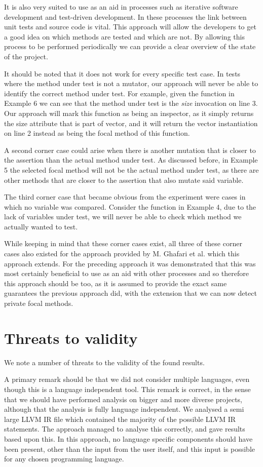 \documentclass[11pt]{article}
\begin{document}
\begin{multicols}{2}
It is also very suited to use as an aid in processes such as  iterative software development and test-driven development. In these processes the link between unit tests and source code is vital. This approach will allow the developers to get a good idea on which methods are tested and which are not. By allowing this process to be performed periodically we can provide a clear overview of the state of the project.

It should be noted that it does not work for every specific test case. In tests where the method under test is not a mutator, our approach will never be able to identify the correct method under test. For example, given the function in Example 6 we can see that the method under test is the \textit{size} invocation on line 3. Our approach will mark this function as being an inspector, as it simply returns the size attribute that is part of vector, and it will return the vector instantiation on line 2 instead as being the focal method of this function. 

A second corner case could arise when there is another mutation that is closer to the assertion than the actual method under test. As discussed before, in Example 5 the selected focal method will not be the actual method under test, as there are other methods that are closer to the assertion that also mutate said variable.

The third corner case that became obvious from the experiment were cases in which no variable was compared. Consider the function in Example 4, due to the lack of variables under test, we will never be able to check which method we actually wanted to test.

While keeping in mind that these corner cases exist, all three of these corner cases also existed for the approach provided by M. Ghafari et al. \cite{ghafari2015automatically} which this approach extends. For the preceding approach it was demonstrated that this was most certainly beneficial to use as an aid with other processes and so therefore this approach should be too, as it is assumed to provide the exact same guarantees the previous approach did, with the extension that we can now detect private focal methods.

\section{Threats to validity}
We note a number of threats to the validity of the found results.

A primary remark should be that we did not consider multiple languages, even though this is a language independent tool. This remark is correct, in the sense that we should have performed analysis on bigger and more diverse projects, although that the analysis is fully language independent. We analysed a semi large LLVM IR file which contained the majority of the possible LLVM IR statements. The approach managed to analyse this correctly, and gave results based upon this. In this approach, no language specific components should have been present, other than the input from the user itself, and this input is possible for any chosen programming language. 


\end{multicols}
\end{document}
